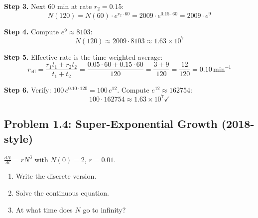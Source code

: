 \documentclass[10pt]{article}
\begin{document}
\begin{solution}
\textbf{Step 3.} Next 60 min at rate $r_2 = 0.15$:
\[
N(120) = N(60)\cdot e^{r_2\cdot 60} = 2009\cdot e^{0.15\cdot 60} = 2009\cdot e^{9}
\]

\textbf{Step 4.} Compute $e^9 \approx 8103$:
\[
N(120) \approx 2009\cdot 8103 \approx 1.63\times 10^7
\]

\textbf{Step 5.} Effective rate is the time-weighted average:
\[
r_{\text{eff}} = \frac{r_1 t_1 + r_2 t_2}{t_1 + t_2} = \frac{0.05\cdot 60 + 0.15\cdot 60}{120} = \frac{3 + 9}{120} = \frac{12}{120} = 0.10\,\text{min}^{-1}
\]

\textbf{Step 6.} Verify: $100\,e^{0.10\cdot 120} = 100\,e^{12}$. Compute $e^{12} \approx 162754$:
\[
100\cdot 162754 \approx 1.63\times 10^7 \checkmark
\]
\end{solution}

\subsection{Problem 1.4: Super-Exponential Growth (2018-style)}

\begin{problem}
$\frac{dN}{dt} = rN^3$ with $N(0) = 2$, $r = 0.01$.

\begin{enumerate}[label=(\alph*)]
\item Write the discrete version.
\item Solve the continuous equation.
\item At what time does $N$ go to infinity?
\end{enumerate}
\end{problem}
\end{document}

